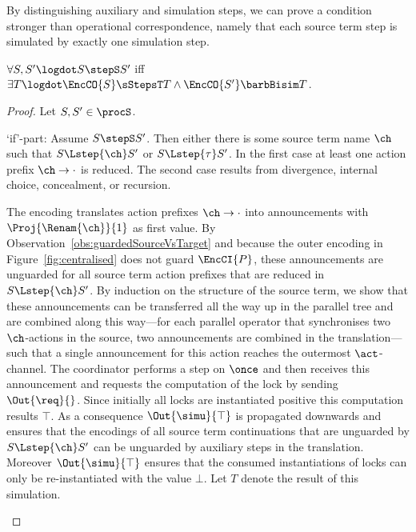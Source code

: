 \documentclass[]{eptcs}
\begin{document}
By distinguishing auxiliary and simulation steps, we can prove a condition stronger than operational correspondence, namely that each source term step is simulated by exactly one simulation step.

\begin{lemma}
	$ \forall S, S'\logdot S \stepS S' $ iff $ \exists T\logdot \EncCO{S} \sStepsT T \wedge \EncCO{S'} \barbBisim T $.
	\label{lem:sourceVsSimStep}
\end{lemma}

\begin{proof}
	Let $ S, S' \in \procS $.
	\begin{compactitem}
		\item[`if'-part:] Assume $ S \stepS S' $. Then either there is some source term name $ \ch $ such that $ S \Lstep{\ch} S' $ or $ S \Lstep{\tau} S' $. In the first case at least one action prefix $ \ch \rightarrow \cdot $ is reduced. The second case results from divergence, internal choice, concealment, or recursion.
			\begin{compactenum}
				\item The encoding translates action prefixes $ \ch \rightarrow \cdot $ into announcements with $ \Proj{\Renam{\ch}}{1} $ as first value. By Observation~\ref{obs:guardedSourceVsTarget} and because the outer encoding in Figure~\ref{fig:centralised} does not guard $ \EncCI{P} $, these announcements are unguarded for all source term action prefixes that are reduced in $ S \Lstep{\ch} S' $. By induction on the structure of the source term, we show that these announcements can be transferred all the way up in the parallel tree and are combined along this way---for each parallel operator that synchronises two $ \ch $-actions in the source, two announcements are combined in the translation---such that a single announcement for this action reaches the outermost $ \act $-channel. The coordinator performs a step on $ \once $ and then receives this announcement and requests the computation of the lock by sending $ \Out{\req}{} $. Since initially all locks are instantiated positive this computation results $ \top $. As a consequence $ \Out{\simu}{\top} $ is propagated downwards and ensures that the encodings of all source term continuations that are unguarded by $ S \Lstep{\ch} S' $ can be unguarded by auxiliary steps in the translation.
					Moreover $ \Out{\simu}{\top} $ ensures that the consumed instantiations of locks can only be re-instantiated with the value $ \bot $. Let $ T $ denote the result of this simulation.
					

\end{compactenum}
\end{compactitem}
\end{proof}
\end{document}
